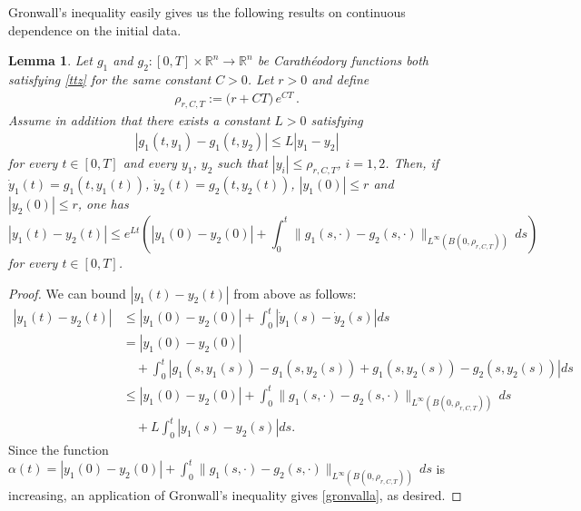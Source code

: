 \documentclass[A4paper,11pt]{article}
\newtheorem{lemma}[theorem]{Lemma}
\theoremstyle{definition}
\newcommand{\R}{\mathbb{R}}
\begin{document}
Gronwall's inequality easily gives us the following results on continuous dependence on the initial data.

\begin{lemma}\label{le:uniquecara}
Let $g_1$ and $g_2\colon[0,T]\times \R^n \to \R^n$ be Carath{\'e}odory functions both satisfying \eqref{ttz} for the same  constant $C > 0$. Let $r>0$ and define 
\begin{align*}
\rho_{r, C, T}:=\Big(r+ CT\Big) \,e^{CT}\,.
\end{align*}
Assume in addition that there exists a constant $L > 0$ satisfying
\begin{align*}
|g_1(t, y_1)-g_1(t, y_2)|\le L|y_1-y_2|
\end{align*}
for every $t \in [0, T]$ and every $y_1$, $y_2$ such that $|y_i|\le \rho_{r, C, T}$, $i=1,2$.
Then, if $\dot y_1(t)=g_1(t, y_1(t))$, $\dot y_2(t)=g_2(t, y_2(t))$, $|y_1(0)|\le r$ and $|y_2(0)|\le r$, one has
\begin{equation}\label{gronvalla}
|y_1(t)-y_2(t)|\le e^{Lt}\left(|y_1(0)-y_2(0)|+\int_0^t \|g_1(s, \cdot)-g_2(s, \cdot)\|_{L^\infty(B(0, \rho_{r, C, T}))} \,ds \right)
\end{equation}
for every $t \in [0, T]$.
\end{lemma}
\begin{proof}
We can bound $|y_1(t) - y_2(t)|$ from above as follows:
\begin{align*}
|y_1(t) - y_2(t)| &\leq |y_1(0) - y_2(0)| + \int^t_0 |\dot{y}_1(s) - \dot{y}_2(s)| ds \\
&= |y_1(0) - y_2(0)| \\
& \quad + \int^t_0 |g_1(s, y_1(s)) - g_1(s, y_2(s)) + g_1(s, y_2(s)) - g_2(s, y_2(s))| ds \\
& \leq |y_1(0) - y_2(0)| + \int_0^t \|g_1(s, \cdot)-g_2(s, \cdot)\|_{L^\infty(B(0, \rho_{r, C, T}))} \,ds \\
& \quad  + L \int^t_0|y_1(s) - y_2(s)| ds.
\end{align*}
Since the function $\alpha(t) = |y_1(0) - y_2(0)| + \int_0^t \|g_1(s, \cdot)-g_2(s, \cdot)\|_{L^\infty(B(0, \rho_{r, C, T}))} \,ds$ is increasing, an application of Gronwall's inequality gives \eqref{gronvalla}, as desired.
\end{proof}
\end{document}

